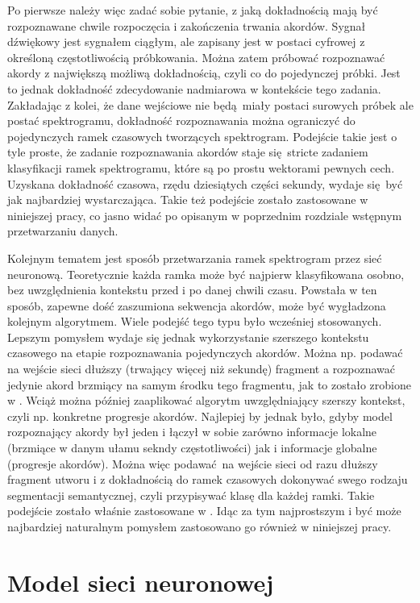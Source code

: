 Po pierwsze należy więc zadać sobie pytanie, z jaką dokładnością mają być rozpoznawane chwile
rozpoczęcia i zakończenia trwania akordów. Sygnał dźwiękowy jest sygnałem ciągłym, ale zapisany jest
w postaci cyfrowej z określoną częstotliwością próbkowania. Można zatem próbować rozpoznawać akordy
z największą możliwą dokładnością, czyli co do pojedynczej próbki. Jest to jednak dokładność
zdecydowanie nadmiarowa w kontekście tego zadania. Zakładając z kolei, że dane wejściowe nie
będą miały postaci surowych próbek ale postać spektrogramu, dokładność rozpoznawania można
ograniczyć do pojedynczych ramek czasowych tworzących spektrogram. Podejście takie jest o tyle
proste, że zadanie rozpoznawania akordów staje się stricte zadaniem klasyfikacji ramek spektrogramu,
które są po prostu wektorami pewnych cech. Uzyskana dokładność czasowa, rzędu dziesiątych części
sekundy, wydaje się być jak najbardziej wystarczająca. Takie też podejście zostało zastosowane w
niniejszej pracy, co jasno widać po opisanym w poprzednim rozdziale wstępnym przetwarzaniu danych.

Kolejnym tematem jest sposób przetwarzania ramek spektrogram przez sieć neuronową. Teoretycznie
każda ramka może być najpierw klasyfikowana osobno, bez uwzględnienia kontekstu przed i po danej
chwili czasu. Powstała w ten sposób, zapewne dość zaszumiona sekwencja akordów, może być wygładzona
kolejnym algorytmem. Wiele podejść tego typu było wcześniej stosowanych. Lepszym pomysłem wydaje się
jednak wykorzystanie szerszego kontekstu czasowego na etapie rozpoznawania pojedynczych akordów.
Można np.  podawać na wejście sieci dłuższy (trwający więcej niż sekundę) fragment a rozpoznawać
jedynie akord brzmiący na samym środku tego fragmentu, jak to zostało zrobione w
\cite{korzeniowski_fully_2016}.  Wciąż można później zaaplikować algorytm uwzględniający szerszy
kontekst, czyli np. konkretne progresje akordów. Najlepiej by jednak było, gdyby model rozpoznający
akordy był jeden i łączył w sobie zarówno informacje lokalne (brzmiące w danym ułamu sekndy
częstotliwości) jak i informacje globalne (progresje akordów). Można więc podawać na wejście sieci
od razu dłuższy fragment utworu i z dokładnością do ramek czasowych dokonywać swego rodzaju
segmentacji semantycznej, czyli przypisywać klasę dla każdej ramki. Takie podejście zostało właśnie
zastosowane w \cite{park_bi-directional_2019}. Idąc za tym najprostszym i być może najbardziej
naturalnym pomysłem zastosowano go również w niniejszej pracy. 



\section{Model sieci neuronowej}

